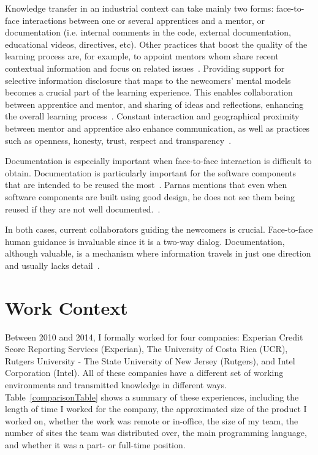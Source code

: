 \documentclass[12pt, letterpaper]{article}
\begin{document}
Knowledge transfer in an industrial context can take mainly two forms:
face-to-face interactions between one or several apprentices and a mentor, or documentation 
(i.e. internal comments in the code, external documentation, educational videos, directives, etc). 
Other practices that boost the quality 
of the learning process are, for example, to appoint mentors whom share recent
contextual information and focus on related issues~\cite{Steinmacher12}. Providing support for selective information disclosure that
maps to the newcomers' mental models becomes a crucial part of the learning
experience. This enables collaboration between apprentice and mentor, and sharing of ideas and reflections, 
enhancing the overall learning process~\cite{Razavi06}. Constant interaction
and geographical proximity between mentor and apprentice also enhance communication, as well as 
practices such as openness, honesty, trust, respect and transparency~\cite{Whitworth06}. 

Documentation is especially important when face-to-face interaction is difficult to obtain.
Documentation is particularly important 
for the software components that are intended to be reused the most~\cite{monperrus11}. Parnas mentions that even
when software components are built using good design, he does not see 
them being
reused if they are not well documented.~\cite{brooks95}. 

In both cases, current collaborators guiding the newcomers is crucial.
Face-to-face human guidance is invaluable since it is a two-way dialog. Documentation,
although valuable, is a mechanism
where information travels in just one direction and usually lacks detail~\cite{Dagenais10}.
 
\section{Work Context}
Between 2010 and 2014, I formally worked for four companies: Experian Credit 
Score Reporting Services (Experian), The University of Costa Rica (UCR), Rutgers University - The State University of New 
Jersey (Rutgers), and Intel Corporation (Intel). All of these companies 
have a different set of working environments and transmitted knowledge in different ways. Table~\ref{comparisonTable}
shows a summary of
these experiences, including the length of time I worked for the company, the 
approximated size of the product I worked on, whether the work was remote or in-office, the size of my 
team, the number of sites the team was distributed over, the main programming language,
and whether it was a part- or full-time position.
\end{document}
